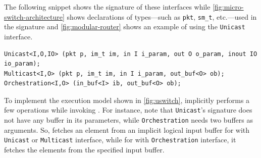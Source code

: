\documentclass[letterpaper,twocolumn,10pt]{article}
\begin{document}
The following snippet shows the signature of these interfaces while
\cref{fig:micro-switch-architecture} shows declarations of
types---such as \texttt{pkt}, \texttt{sm\_t}, etc.---used in the
signature and \cref{fig:modular-router} shows an example of using the
\texttt{Unicast} interface.

\begin{lstlisting}[frame=none]
Unicast<I,O,IO> (pkt p, im_t im, in I i_param, out O o_param, inout IO io_param);
Multicast<I,O> (pkt p, im_t im, in I i_param, out_buf<O> ob);
Orchestration<I,O> (in_buf<I> ib, out_buf<O> ob);
\end{lstlisting}

To implement the execution model shown in \cref{fig:uswitch}, \uswitch
implicitly performs a few operations while invoking \uprograms. For
instance, note that \texttt{Unicast}'s signature does not have any
buffer in its parameters, while \texttt{Orchestration} needs two
buffers as arguments. So, \uswitch fetches an element from an implicit
logical input buffer for \uprograms with \texttt{Unicast} or
\texttt{Multicast} interface, while for \uprograms with
\texttt{Orchestration} interface, it fetches the elements from the
specified input buffer.


\end{document}
